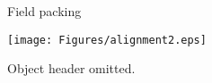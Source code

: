 \documentclass[%
pdf,
colorBG,
slideColor,
nototal,
oqe
]{prosper}
\begin{document}


\begin{slide}{Field packing}
\begin{center}
\vspace{0.75cm}
\texttt{[image: Figures/alignment2.eps]}

\small Object header omitted.
\end{center}
\end{slide}
\end{document}
